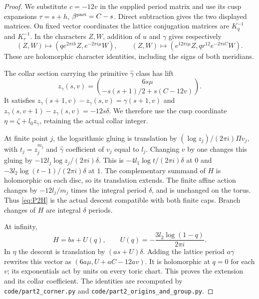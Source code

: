 \begin{proof}
We substitute $c=-12v$ in the supplied period matrix and use its cusp expansions $\tau=s+h$, $\beta^{\rm part}=C-s$. Direct subtraction gives the two displayed matrices. On fixed vector coordinates the lattice conjugation matrices are $K_q^{-1}$ and $K_r^{-1}$. In the characters $Z,W$, addition of $u$ and $\gamma$ gives respectively
\[
 (Z,W)\mapsto(qe^{2\pi ih}Z,e^{-2\pi i\mu}W),\qquad
 (Z,W)\mapsto(e^{12\pi i\mu}Z,qr^{12}e^{-2\pi iC}W).
\]
These are holomorphic character identities, including the signs of both meridians.

The collar section carrying the primitive $\widehat\gamma$ class has lift
\begin{equation}\label{eq:P2zg}
 z_\gamma(s,v)=\binom{6s\mu}{-s(s+1)/2+s(C-12v)}.
\end{equation}
It satisfies $z_\gamma(s+1,v)-z_\gamma(s,v)=\gamma(s+1,v)$ and $z_\gamma(s,v+1)-z_\gamma(s,v)=-12s\delta$. We therefore use the cusp coordinate $\eta=\zeta+l_0z_\gamma$, retaining the actual collar integer.

At finite point $j$, the logarithmic gluing is translation by $(\log z_j)/(2\pi i)\Pi v_j$, with $t_j=z_j^{m_j}$ and $\widehat\gamma$ coefficient of $v_j$ equal to $l_j$. Changing $v$ by one changes this gluing by $-12l_j\log z_j/(2\pi i)\delta$. This is $-4l_1\log t/(2\pi i)\delta$ at $0$ and $-3l_2\log(t-1)/(2\pi i)\delta$ at $1$. The complementary summand of $H$ is holomorphic on each disc, so its translation extends. The finite affine action changes by $-12l_j/m_j$ times the integral period $\delta$, and is unchanged on the torus. Thus \eqref{eq:P2H} is the actual descent compatible with both finite caps. Branch changes of $H$ are integral $\delta$ periods.

At infinity,
\[
 H=bs+U(q),\qquad U(q)=-\frac{3l_2\log(1-q)}{2\pi i}.
\]
In $\eta$ the descent is translation by $(as+U)\delta$. Adding the lattice period $a\gamma$ rewrites this vector as $(6a\mu,U+aC-12av)$. It is holomorphic at $q=0$ for each $v$; its exponentials act by units on every toric chart. This proves the extension and its collar coefficient. The identities are recomputed by \texttt{code/part2\_corner.py} and \texttt{code/part2\_origins\_and\_group.py}.
\end{proof}

